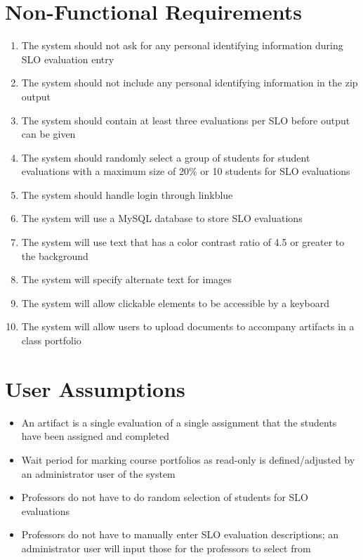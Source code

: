 \documentclass[a4paper,12pt]{article}
\begin{document}
\section*{Non-Functional Requirements}
\begin{enumerate}[label=NFR\arabic*.]
\item The system should not ask for any personal identifying information during SLO evaluation entry
\item The system should not include any personal identifying information in the zip output
\item The system should contain at least three evaluations per SLO before output can be given
\item The system should randomly select a group of students for student evaluations with a maximum size of 20\% or 10 students for SLO evaluations
\item The system should handle login through linkblue
\item The system will use a MySQL database to store SLO evaluations
\item The system will use text that has a color contrast ratio of 4.5 or greater to the background
\item The system will specify alternate text for images
\item The system will allow clickable elements to be accessible by a keyboard
\item The system will allow users to upload documents to accompany artifacts in a class portfolio 
\end{enumerate}

\section*{User Assumptions}
\begin{itemize}
\item An artifact is a single evaluation of a single assignment that the students have been assigned and completed
\item Wait period for marking course portfolios as read-only is defined/adjusted by an administrator user of the system 
\item Professors do not have to do random selection of students for SLO evaluations
\item Professors do not have to manually enter SLO evaluation descriptions; an administrator user will input those for the professors to select from
\end{itemize}
\end{document}
